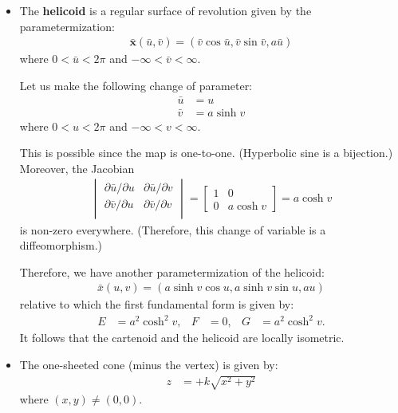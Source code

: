 \documentclass[10pt]{article}
\newcommand{\ve}[1]{\mathbf{#1}}
\begin{document}
\begin{itemize}
    \item The {\bf helicoid} is a regular surface of revolution given by the parametermization:
    \begin{align*}
      \bar{\ve{x}}(\bar u, \bar v) = (\bar v \cos \bar u, \bar v \sin \bar v, a \bar u)
    \end{align*}
    where $0 < \bar u < 2\pi$ and $-\infty < \bar v < \infty$.

    Let us make the following change of parameter:
    \begin{align*}
      \bar u &= u \\
      \bar v &= a \sinh v
    \end{align*}
    where $0 < u < 2\pi$ and $-\infty < v < \infty$.

    This is possible since the map is one-to-one. (Hyperbolic sine is a bijection.) Moreover, the Jacobian
    \begin{align*}
      \begin{vmatrix}
        \partial \bar u / \partial u & \partial \bar u / \partial v \\
        \partial \bar v / \partial u & \partial \bar v / \partial v \\
      \end{vmatrix}
      =
      \begin{bmatrix}
        1 & 0\\
        0 & a \cosh v
      \end{bmatrix}
      = a\cosh v
    \end{align*}
    is non-zero everywhere. (Therefore, this change of variable is a diffeomorphism.)

    Therefore, we have another parametermization of the helicoid:
    \begin{align*}
      \bar{x}(u,v) = (a \sinh v \cos u, a \sinh v \sin u, au)
    \end{align*}
    relative to which the first fundamental form is given by:
    \begin{align*}
      E &= a^2 \cosh^2 v, & F &= 0, & G &= a^2 \cosh^2 v.
    \end{align*}
    It follows that the cartenoid and the helicoid are locally isometric.

    \item The one-sheeted cone (minus the vertex) is given by:
    \begin{align*}
      z &= +k \sqrt{x^2 + y^2}
    \end{align*}
    where $(x,y) \neq (0,0)$.


\end{itemize}
\end{document}
